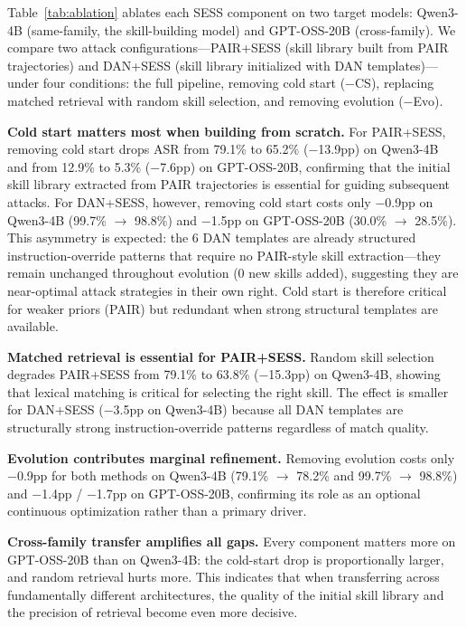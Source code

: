 \documentclass{article} %
\begin{document}
Table~\ref{tab:ablation} ablates each SESS component on two target models: Qwen3-4B (same-family, the skill-building model) and GPT-OSS-20B (cross-family). We compare two attack configurations---PAIR+SESS (skill library built from PAIR trajectories) and DAN+SESS (skill library initialized with DAN templates)---under four conditions: the full pipeline, removing cold start ($-$CS), replacing matched retrieval with random skill selection, and removing evolution ($-$Evo).

\textbf{Cold start matters most when building from scratch.} For PAIR+SESS, removing cold start drops ASR from 79.1\% to 65.2\% ($-$13.9pp) on Qwen3-4B and from 12.9\% to 5.3\% ($-$7.6pp) on GPT-OSS-20B, confirming that the initial skill library extracted from PAIR trajectories is essential for guiding subsequent attacks. For DAN+SESS, however, removing cold start costs only $-$0.9pp on Qwen3-4B (99.7\% $\to$ 98.8\%) and $-$1.5pp on GPT-OSS-20B (30.0\% $\to$ 28.5\%). This asymmetry is expected: the 6 DAN templates are already structured instruction-override patterns that require no PAIR-style skill extraction---they remain unchanged throughout evolution (0 new skills added), suggesting they are near-optimal attack strategies in their own right. Cold start is therefore critical for weaker priors (PAIR) but redundant when strong structural templates are available.

\textbf{Matched retrieval is essential for PAIR+SESS.} Random skill selection degrades PAIR+SESS from 79.1\% to 63.8\% ($-$15.3pp) on Qwen3-4B, showing that lexical matching is critical for selecting the right skill. The effect is smaller for DAN+SESS ($-$3.5pp on Qwen3-4B) because all DAN templates are structurally strong instruction-override patterns regardless of match quality.

\textbf{Evolution contributes marginal refinement.} Removing evolution costs only $-$0.9pp for both methods on Qwen3-4B (79.1\% $\to$ 78.2\% and 99.7\% $\to$ 98.8\%) and $-$1.4pp / $-$1.7pp on GPT-OSS-20B, confirming its role as an optional continuous optimization rather than a primary driver.

\textbf{Cross-family transfer amplifies all gaps.} Every component matters more on GPT-OSS-20B than on Qwen3-4B: the cold-start drop is proportionally larger, and random retrieval hurts more. This indicates that when transferring across fundamentally different architectures, the quality of the initial skill library and the precision of retrieval become even more decisive.
\end{document}
